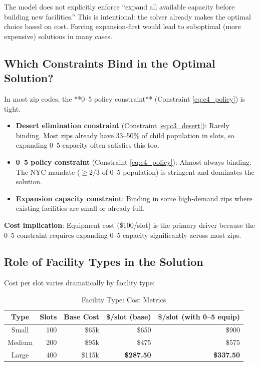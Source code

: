 \documentclass[12pt]{article}
\begin{document}
The model does not explicitly enforce ``expand all available capacity before building new facilities.'' 
This is intentional: the solver already makes the optimal choice based on cost. Forcing expansion-first 
would lead to suboptimal (more expensive) solutions in many cases.

\subsection{Which Constraints Bind in the Optimal Solution?}

In most zip codes, the **0--5 policy constraint** (Constraint \eqref{eq:c4_policy}) is tight.

\begin{itemize}
    \item \textbf{Desert elimination constraint} (Constraint \eqref{eq:c3_desert}): Rarely binding. 
    Most zips already have 33--50\% of child population in slots, so expanding 0--5 capacity often satisfies this too.
    
    \item \textbf{0--5 policy constraint} (Constraint \eqref{eq:c4_policy}): Almost always binding. 
    The NYC mandate ($\geq 2/3$ of 0--5 population) is stringent and dominates the solution.
    
    \item \textbf{Expansion capacity constraint}: Binding in some high-demand zips where existing facilities 
    are small or already full.
\end{itemize}

\noindent
\textbf{Cost implication}: Equipment cost (\$100/slot) is the primary driver because the 0--5 constraint 
requires expanding 0--5 capacity significantly across most zips.

\subsection{Role of Facility Types in the Solution}

Cost per slot varies dramatically by facility type:

\begin{table}[h]
\centering
\caption{Facility Type: Cost Metrics}
\begin{tabular}{|c|r|r|r|r|}
\hline
\textbf{Type} & \textbf{Slots} & \textbf{Base Cost} & \textbf{\$/slot (base)} & \textbf{\$/slot (with 0--5 equip)} \\
\hline
Small & 100 & \$65k & \$650 & \$900 \\
\hline
Medium & 200 & \$95k & \$475 & \$575 \\
\hline
Large & 400 & \$115k & \textbf{\$287.50} & \textbf{\$337.50} \\
\hline
\end{tabular}
\end{table}
\end{document}
